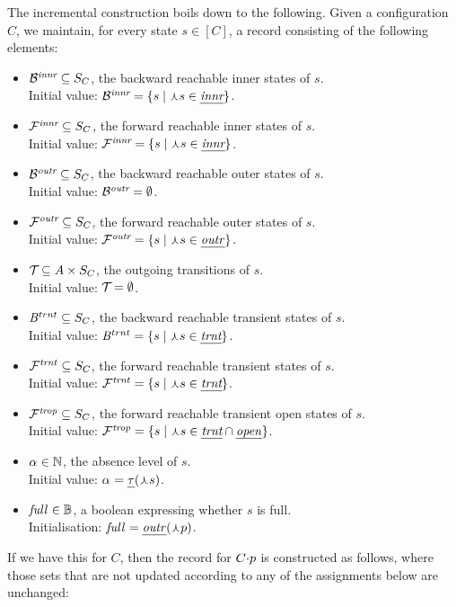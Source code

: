 \documentclass{article}
\begin{document}
%
The incremental construction boils down to the following. Given a configuration $C$, we maintain, for every state $s\in [C]$, a record consisting of the following elements:
%
\begin{itemize}
\item $\BackIn\subseteq S_C$, the backward reachable inner states of $s$. \\ 
	Initial value: $\BackIn = \gensetof{s}{\prm s\in \pInner}$.
\item $\mathcal{F}^{\smash{\mathit{innr}_{\!\,}\!}}_{\smash{\mkern2mu}}\subseteq S_C$, the forward reachable inner states of $s$. \\ 
	Initial value: $\ForwIn = \gensetof{s}{\prm s\in \pInner}$.
\item $\BackOut\subseteq S_C$, the backward reachable outer states of $s$. \\ 
	Initial value: $\BackOut = \emptyset$.
\item $\mathcal{F}^{\smash{\mathit{outr}_{\!\,}\!}}_{\smash{\mkern2mu}}\subseteq S_C$, the forward reachable outer states of $s$. \\ 
	Initial value: $\ForwOut = \gensetof{s}{\prm s\in \pOuter}$.
\item $\mathcal{T}_{\smash{\mkern2mu}}\subseteq A\times S_C$, the outgoing transitions of $s$. \\ 
	Initial value: $\mathcal{T}_{\smash{\mkern2mu}} = \emptyset$.
\item $\mathit{B}^{\smash{trnt}}_{\smash{\mkern-2mu}}\subseteq S_C$, the backward reachable transient states of $s$. \\ 
	Initial value: $\BackTrans = \gensetof{s}{\prm s\in \pTransient}$.
\item $\mathcal{F}^{\mathit{trnt}}_{\smash{\mkern2mu}}\subseteq S_C$, the forward reachable transient states of $s$. \\ 
	Initial value: $\ForwTrans = \gensetof{s}{\prm s\in \pTransient}$.
\item $\mathcal{F}^{\mathit{trop}}_{\smash{\mkern2mu}}\subseteq S_C$, the forward reachable transient open states of $s$. \\ 
	Initial value: $\ForwTrOp = \gensetof{s}{\prm s\in \pTransient\cap \pOpen}$.
\item $\alpha_{}\in \mathbb{N}$, the absence level of $s$. \\ 
	Initial value: $\ALevel = \pTLevel(\prm s)$.
\item $\Full\in \boolB$, a boolean expressing whether $s$ is full. \\ 
	Initialisation: $\Full = \pOuter(\prm p)$.
\end{itemize}
%
If we have this for $C$, then the record for ${C}{\cdot}{p}$ is constructed as follows, where those sets that are not updated according to any of the assignments below are unchanged:
\end{document}
